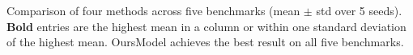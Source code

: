 \caption{Comparison of four methods across five benchmarks (mean $\pm$ std over 5 seeds). \textbf{Bold} entries are the highest mean in a column or within one standard deviation of the highest mean. OursModel achieves the best result on all five benchmarks.}
